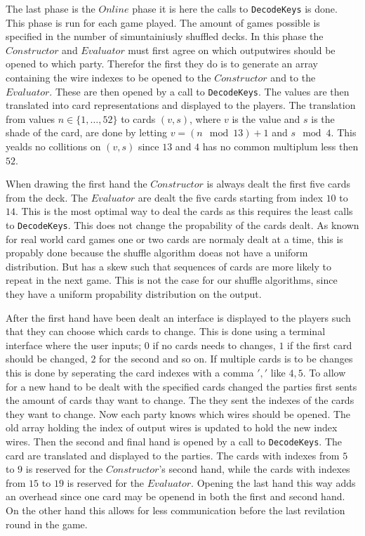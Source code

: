 \documentclass[twoside,11pt,openright]{report}
\begin{document}
The last phase is the $Online$ phase it is here the calls to \verb|DecodeKeys| is done. This phase is run for each game played. The amount of games possible is specified in the number of simuntainiusly shuffled decks. In this phase the $Constructor$ and $Evaluator$ must first agree on which outputwires should be opened to which party. Therefor the first they do is to generate an array containing the wire indexes to be opened to the $Constructor$ and to the $Evaluator$. These are then opened by a call to \verb|DecodeKeys|. The values are then translated into card representations and displayed to the players. 
The translation from values $n\in \{1,\dots,52\}$ to cards $(v,s)$, where $v$ is the value and $s$ is the shade of the card, are done by letting $v=(n \mod 13)+1$ and $s \mod 4$. This yealds no collitions on $(v,s)$ since $13$ and $4$ has no common multiplum less then $52$. 

When drawing the first hand the $Constructor$ is always dealt the first five cards from the deck. The $Evaluator$ are dealt the five cards starting from index $10$ to $14$. This is the most optimal way to deal the cards as this requires the least calls to \verb|DecodeKeys|. This does not change the propability of the cards dealt. As known for real world card games one or two cards are normaly dealt at a time, this is propably done because the shuffle algorithm doeas not have a uniform distribution. But has a skew such that sequences of cards are more likely to repeat in the next game. This is not the case for our shuffle algorithms, since they have a uniform propability distribution on the output.

After the first hand have been dealt an interface is displayed to the players such that they can choose which cards to change. This is done using a terminal interface where the user inputs; $0$ if no cards needs to changes, $1$ if the first card should be changed, $2$ for the second and so on. If multiple cards is to be changes this is done by seperating the card indexes with a comma $','$ like $4,5$. To allow for a new hand to be dealt with the specified cards changed the parties first sents the amount of cards thay want to change. The they sent the indexes of the cards they want to change. Now each party knows which wires should be opened. The old array holding the index of output wires is updated to hold the new index wires. Then the second and final hand is opened by a call to \verb|DecodeKeys|. The card are translated and  displayed to the parties. The cards with indexes from $5$ to $9$ is reserved for the $Constructor$'s second hand, while the cards with indexes from $15$ to $19$ is reserved for the $Evaluator$. Opening the last hand this way adds an overhead since one card may be openend in both the first and second hand. On the other hand this allows for less communication before the last revilation round in the game.
\end{document}
